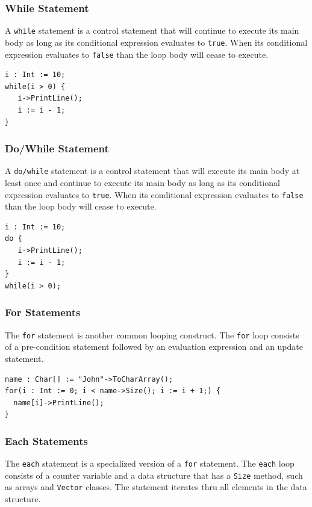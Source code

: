 \documentclass[12pt]{article}
\begin{document}
\subsubsection{While Statement}

A \texttt{while} statement is a control statement that will continue to execute its main body as long as its conditional expression evaluates to \texttt{true}.  When its conditional expression evaluates to \texttt{false} than the loop body will cease to execute.

\begin{verbatim}
i : Int := 10;
while(i > 0) {
   i->PrintLine();
   i := i - 1;
}
\end{verbatim}

\subsubsection{Do/While Statement}

A \texttt{do/while} statement is a control statement that will execute its main body at least once and continue to execute its main body as long as its conditional expression evaluates to \texttt{true}.  When its conditional expression evaluates to \texttt{false} than the loop body will cease to execute.

\begin{verbatim}
i : Int := 10;
do { 
   i->PrintLine();
   i := i - 1;
} 
while(i > 0);
\end{verbatim}

\subsubsection{For Statements}

The \texttt{for} statement is another common looping construct.  The \texttt{for} loop consists of a pre-condition statement followed by an evaluation expression and an update statement.

\begin{verbatim}
name : Char[] := "John"->ToCharArray();
for(i : Int := 0; i < name->Size(); i := i + 1;) {
  name[i]->PrintLine();
}
\end{verbatim}

\subsubsection{Each Statements}

The \texttt{each} statement is a specialized version of a \texttt{for} statement.  The \texttt{each} loop consists of a counter variable and a data structure that has a \texttt{Size} method, such as arrays and \texttt{Vector} classes.  The statement iterates thru all elements in the data structure.
\end{document}
